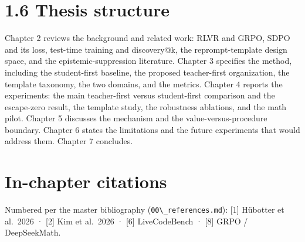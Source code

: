 \section{1.6 Thesis structure}\label{thesis-structure}

Chapter 2 reviews the background and related work: RLVR and GRPO, SDPO and its loss, test-time training and discovery@k, the reprompt-template design space, and the epistemic-suppression literature. Chapter 3 specifies the method, including the student-first baseline, the proposed teacher-first organization, the template taxonomy, the two domains, and the metrics. Chapter 4 reports the experiments: the main teacher-first versus student-first comparison and the escape-zero result, the template study, the robustness ablations, and the math pilot. Chapter 5 discusses the mechanism and the value-versus-procedure boundary. Chapter 6 states the limitations and the future experiments that would address them. Chapter 7 concludes.

\section{In-chapter citations}\label{in-chapter-citations}

Numbered per the master bibliography (\passthrough{\lstinline!00\_references.md!}): {[}1{]} Hübotter et al.~2026 · {[}2{]} Kim et al.~2026 · {[}6{]} LiveCodeBench · {[}8{]} GRPO / DeepSeekMath.
